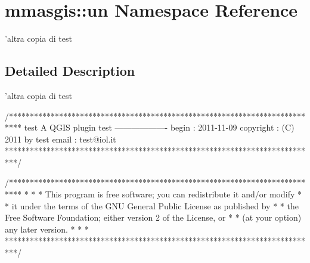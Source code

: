 \hypertarget{namespacemmasgis_1_1un}{
\section{mmasgis::un Namespace Reference}
\label{namespacemmasgis_1_1un}
}


'altra copia di test  




\subsection{Detailed Description}
'altra copia di test \begin{DoxyVerb}
/***************************************************************************
 test
                         A QGIS plugin
 test
                      -------------------
begin                : 2011-11-09
copyright            : (C) 2011 by test
email                : test@iol.it
 ***************************************************************************/

/***************************************************************************
 *                                                                         *
 *   This program is free software; you can redistribute it and/or modify  *
 *   it under the terms of the GNU General Public License as published by  *
 *   the Free Software Foundation; either version 2 of the License, or     *
 *   (at your option) any later version.                                   *
 *                                                                         *
 ***************************************************************************/
\end{DoxyVerb}
 